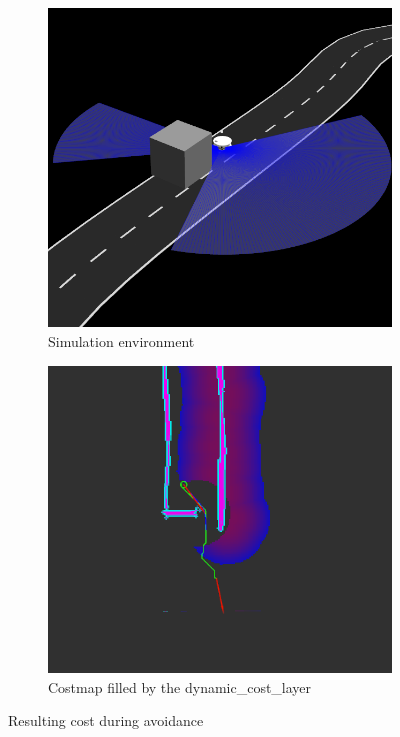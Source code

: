 \begin{figure} 
	\centering
	\begin{subfigure}{.45\linewidth}
		\includegraphics[width=\textwidth]{Pictures/avoidance}
		\caption{Simulation environment}
		\end{subfigure}	
	\begin{subfigure}{.45\linewidth}
		\includegraphics[width=\textwidth]{Pictures/avoid cost}
		\caption{Costmap filled by the dynamic\_cost\_layer}
	\end{subfigure}
	\caption{Resulting cost during avoidance}
	\label{dyncost}
\end{figure}


